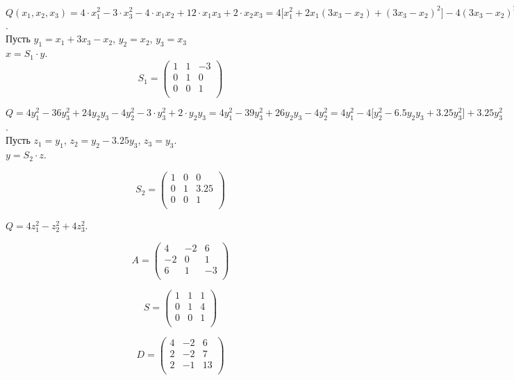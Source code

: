 	
$Q(x_1,x_2,x_3) = 4 \cdot x_1^2 - 3 \cdot x_3^2 - 4 \cdot x_1x_2 + 12 \cdot x_1x_3 + 2 \cdot x_2x_3 = 
4\bigl[x_1^2 +2x_1(3x_3 - x_2) + (3x_3 - x_2)^2 \bigr] - 4(3x_3 - x_2)^2 - 3 \cdot x_3^2 + 2 \cdot x_2x_3$. \\
Пусть $y_1 = x_1 + 3x_3 - x_2$, $y_2 = x_2$, $y_3 = x_3$ \\

$x = S_1 \cdot y$.
\[ S_1 =
\begin{pmatrix}
1 & 1 & -3 \\
0 & 1 & 0 \\
0 & 0 & 1 \\
\end{pmatrix}
\]

$Q = 4y_1^2 -36y_3^2 + 24y_2y_3 - 4y_2^2 - 3 \cdot y_3^2 + 2 \cdot y_2y_3 = 4y_1^2 -39y_3^2 + 26y_2y_3 - 4y_2^2 = 4y_1^2 - 4\bigl[ y_2^2 - 6.5y_2y_3 + 3.25y_3^2 \bigr] + 3.25y_3^2$.\\
Пусть $z_1 = y_1$, $z_2 = y_2 - 3.25y_3$, $z_3 = y_3$. \\

$y = S_2 \cdot z$. 

\[ S_2 =
\begin{pmatrix}
1 & 0 & 0 \\
0 & 1 & 3.25 \\
0 & 0 & 1 \\
\end{pmatrix}
\]

$Q = 4z_1^2 - z_2^2 + 4z_3^2$.

\[ A =
\begin{pmatrix}
4 & -2 & 6 \\
-2 & 0 & 1 \\
6 & 1 & -3 \\
\end{pmatrix}
\]

\[ S =
\begin{pmatrix}
1 & 1 & 1 \\
0 & 1 & 4 \\
0 & 0 & 1 \\
\end{pmatrix}
\]

\[ D =
\begin{pmatrix}
4 & -2 & 6 \\
2 & -2 & 7 \\
2 & -1 & 13 \\
\end{pmatrix}
\]

	